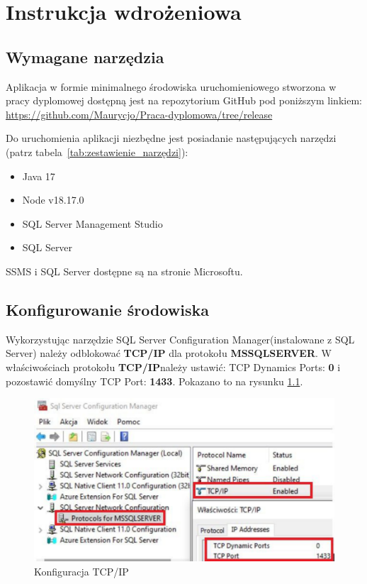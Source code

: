 \chapter{Instrukcja wdrożeniowa}

\section{Wymagane narzędzia}
Aplikacja w formie minimalnego środowiska uruchomieniowego stworzona w pracy dyplomowej dostępną jest na repozytorium GitHub pod poniższym linkiem: \newline
 \url{https://github.com/Maurycjo/Praca-dyplomowa/tree/release}


Do uruchomienia aplikacji niezbędne jest posiadanie następujących narzędzi (patrz tabela~\ref{tab:zestawienie_narzędzi}): 
\begin{itemize}
	\item Java 17
	\item Node v18.17.0
	\item SQL Server Management Studio
	\item SQL Server 
\end{itemize}

SSMS i SQL Server dostępne są na stronie Microsoftu.


\section{Konfigurowanie środowiska}
Wykorzystując narzędzie SQL Server Configuration Manager(instalowane z SQL Server) należy odblokować \textbf{TCP/IP} dla protokołu \textbf{MSSQLSERVER}. W właściwościach protokołu \textbf{TCP/IP}należy ustawić: TCP Dynamics Ports: \textbf{0} i pozostawić domyślny TCP Port: \textbf{1433}. Pokazano to na rysunku \ref{tcpip:label}.
\begin{figure}[htb]
		\centering
    \includegraphics[width=0.6\linewidth]{rysA/tcpip.pdf}
    \caption{Konfiguracja TCP/IP}
    \label{tcpip:label}
\end{figure}


